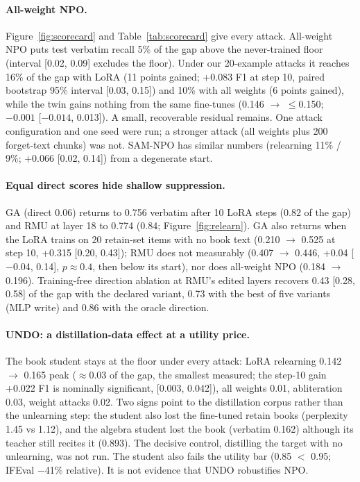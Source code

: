\documentclass[10pt,twocolumn,letterpaper]{article}
\begin{document}
\paragraph{All-weight NPO.} Figure~\ref{fig:scorecard} and Table~\ref{tab:scorecard} give every attack. All-weight NPO puts
test verbatim recall 5\% of the gap above the never-trained floor (interval [0.02, 0.09] excludes the floor). Under our
20-example attacks it reaches 16\% of the gap with LoRA (11 points gained; +0.083 F1 at step 10, paired bootstrap 95\%
interval [0.03, 0.15]) and 10\% with all weights (6 points gained), while the twin gains nothing from the same fine-tunes
(0.146 $\rightarrow$ $\le$0.150; $-0.001$ [$-0.014$, 0.013]). A small, recoverable residual remains. One attack
configuration and one seed were run; a stronger attack (all weights plus 200 forget-text chunks) was not. SAM-NPO has similar numbers (relearning 11\% / 9\%; +0.066 [0.02, 0.14]) from a degenerate start.

\paragraph{Equal direct scores hide shallow suppression.} GA (direct 0.06) returns to 0.756 verbatim after 10 LoRA steps
(0.82 of the gap) and RMU at layer 18 to 0.774 (0.84; Figure~\ref{fig:relearn}). GA also returns when the LoRA trains on
20 retain-set items with no book text (0.210 $\rightarrow$ 0.525 at step 10, +0.315 [0.20, 0.43]); RMU does not measurably
(0.407 $\rightarrow$ 0.446, +0.04 [$-$0.04, 0.14], $p\approx0.4$, then below its start), nor does all-weight NPO
(0.184 $\rightarrow$ 0.196). Training-free direction ablation at RMU's edited layers recovers 0.43 [0.28, 0.58] of the gap
with the declared variant, 0.73 with the best of five variants (MLP write) and 0.86 with the oracle direction.

\paragraph{UNDO: a distillation-data effect at a utility price.} The book student stays at the floor under every attack:
LoRA relearning 0.142 $\rightarrow$ 0.165 peak ($\approx$0.03 of the gap, the smallest measured; the step-10 gain +0.022
F1 is nominally significant, [0.003, 0.042]), all weights 0.01, abliteration 0.03, weight attacks 0.02. Two signs point to
the distillation corpus rather than the unlearning step: the student also lost the fine-tuned retain books (perplexity 1.45
vs 1.12), and the algebra student lost the book (verbatim 0.162) although its teacher still recites it (0.893). The decisive
control, distilling the target with no unlearning, was not run. The student also fails the utility bar (0.85 $<$ 0.95;
IFEval $-$41\% relative). It is not evidence that UNDO robustifies NPO.
\end{document}
